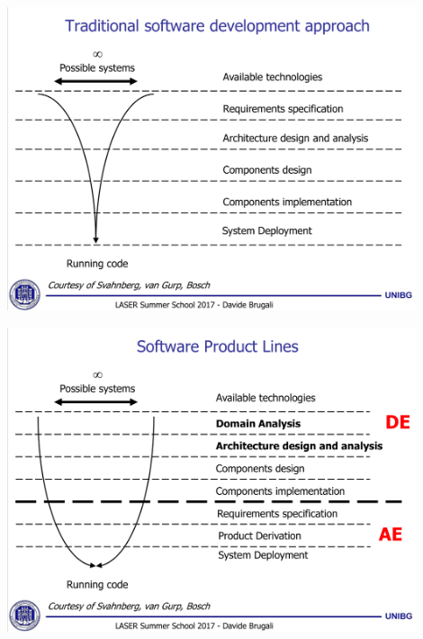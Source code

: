 \documentclass[xetex,mathserif,serif]{beamer}
\begin{document}
	\begin{frame}
		\begin{center}
			\includegraphics[width=0.9\textwidth]{brugali2.png}
		\end{center}
	\end{frame}

	\begin{frame}
		\begin{center}
			\includegraphics[width=0.9\textwidth]{brugali3.png}
		\end{center}
	\end{frame}
\end{document}

